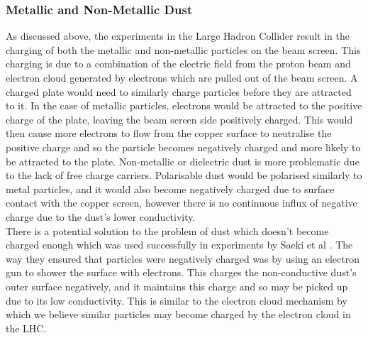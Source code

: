 \documentclass[../main.tex]{subfiles}
\begin{document}
\subsubsection{Metallic and Non-Metallic Dust}
As discussed above, the experiments in the Large Hadron Collider result in the charging of both the metallic and non-metallic particles on the beam screen.
This charging is due to a combination of the electric field from the proton beam and electron cloud generated by electrons which are pulled out of the beam screen.
A charged plate would need to similarly charge particles before they are attracted to it.
In the case of metallic particles, electrons would be attracted to the positive charge of the plate, leaving the beam screen side positively charged.
This would then cause more electrons to flow from the copper surface to neutralise the positive charge and so the particle becomes negatively charged and more likely to be attracted to the plate.
Non-metallic or dielectric dust is more problematic due to the lack of free charge carriers.
Polarisable dust would be polarised similarly to metal particles, and it would also become negatively charged due to surface contact with the copper screen, however there is no continuous influx of negative charge due to the dust's lower conductivity.\\

There is a potential solution to the problem of dust which doesn't become charged enough which was used successfully in experiments by Saeki et al \cite{saeki_essc}.
The way they ensured that particles were negatively charged was by using an electron gun to shower the surface with electrons.
This charges the non-conductive dust's outer surface negatively, and it maintains this charge and so may be picked up due to its low conductivity.
This is similar to the electron cloud mechanism by which we believe similar particles may become charged by the electron cloud in the LHC.
\end{document}
